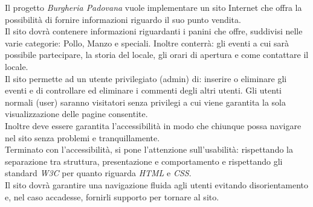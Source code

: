 Il progetto \emph{Burgheria Padovana} vuole implementare un sito Internet che offra la possibilità di fornire informazioni riguardo il suo punto vendita.\\
Il sito dovrà contenere informazioni riguardanti i panini che offre, suddivisi nelle varie categorie: Pollo, Manzo e speciali. Inoltre conterrà: gli eventi a cui sarà possibile partecipare, la storia del locale, gli orari di apertura e come contattare il locale.\\
Il sito permette ad un utente privilegiato (admin) di: inserire o eliminare gli eventi e di controllare ed eliminare i commenti degli altri utenti. Gli utenti normali (user) saranno visitatori 
senza privilegi a cui viene garantita la sola visualizzazione delle pagine consentite.\\
Inoltre deve essere garantita l'accessibilità in modo che chiunque possa navigare nel sito senza problemi e tranquillamente.\\
Terminato con l'accessibilità, si pone l'attenzione sull'usabilità: rispettando la separazione tra struttura, presentazione e comportamento e rispettando gli standard \emph{W3C} per quanto riguarda \emph{HTML} e \emph{CSS}.\\
Il sito dovrà garantire una navigazione fluida agli utenti evitando disorientamento e, nel caso accadesse, fornirli supporto per tornare al sito.\\